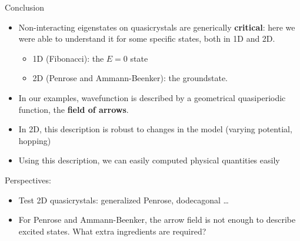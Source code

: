 \documentclass[xcolor=x11names,compress,professionalfonts, aspectratio=169]{beamer}
\renewcommand{\(}{\begin{columns}}
\renewcommand{\)}{\end{columns}}
\newcommand{\<}[1]{\begin{column}{#1}}
\renewcommand{\>}{\end{column}}
\begin{document}
\begin{frame}{Conclusion}
\begin{itemize}
	\item Non-interacting eigenstates on quasicrystals are generically \textbf{critical}: here we were able to understand it for some specific states, both in 1D and 2D.
	\begin{itemize}
		\item 1D (Fibonacci): the $E=0$ state
		\item 2D (Penrose and Ammann-Beenker): the groundstate.
	\end{itemize}
	\item In our examples, wavefunction is described by a geometrical quasiperiodic function, the \textbf{field of arrows}.
	\item In 2D, this description is robust to changes in the model (varying potential, hopping)
	\item Using this description, we can easily computed physical quantities easily
\end{itemize}
Perspectives:
\begin{itemize}
	\item Test 2D quasicrystals: generalized Penrose, dodecagonal \dots
	\item For Penrose and Ammann-Beenker, the arrow field is not enough to describe excited states. What extra ingredients are required?
\end{itemize}
\end{frame}
\end{document}
